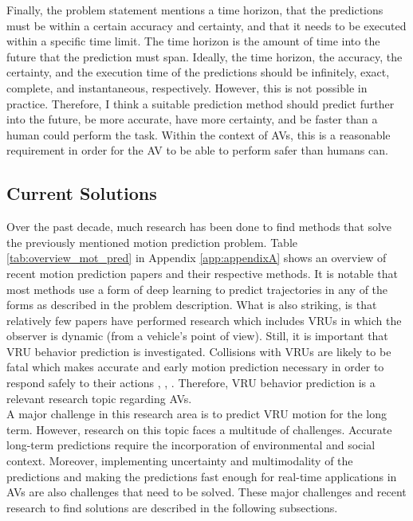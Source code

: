 Finally, the problem statement mentions a time horizon, that the predictions must be within a certain accuracy and certainty, and that it needs to be executed within a specific time limit. The time horizon is the amount of time into the future that the prediction must span. Ideally, the time horizon, the accuracy, the certainty, and the execution time of the predictions should be infinitely, exact, complete, and instantaneous, respectively. However, this is not possible in practice. Therefore, I think a suitable prediction method should predict further into the future, be more accurate, have more certainty, and be faster than a human could perform the task. Within the context of \glspl{AV}, this is a reasonable requirement in order for the \gls{AV} to be able to perform safer than humans can.   


\subsection{Current Solutions}
Over the past decade, much research has been done to find methods that solve the previously mentioned motion prediction problem. Table \ref{tab:overview_mot_pred} in Appendix \ref{app:appendixA} shows an overview of recent motion prediction papers and their respective methods. It is notable that most methods use a form of deep learning to predict trajectories in any of the forms as described in the problem description. What is also striking, is that relatively few papers have performed research which includes \glspl{VRU} in which the observer is dynamic (from a vehicle's point of view). Still, it is important that \gls{VRU} behavior prediction is investigated. Collisions with \glspl{VRU} are likely to be fatal which makes accurate and early motion prediction necessary in order to respond safely to their actions \cite{rehder2018pedestrian}, \cite{chou2020predicting}, \cite{uah2020d4}. Therefore, \gls{VRU} behavior prediction is a relevant research topic regarding \glspl{AV}.\\
A major challenge in this research area is to predict \gls{VRU} motion for the long term. However, research on this topic faces a multitude of challenges. Accurate long-term predictions require the incorporation of environmental and social context. Moreover, implementing uncertainty and multimodality of the predictions and making the predictions fast enough for real-time applications in \glspl{AV} are also challenges that need to be solved. These major challenges and recent research to find solutions are described in the following subsections. 

